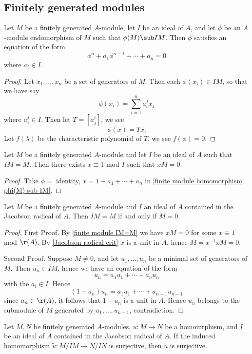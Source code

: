 \subsection{Finitely generated modules}
\begin{proposition}\label{finite module homomorphism phi(M) sub IM}
Let $M$ be a finitely generated $A$-module, let $I$ be an ideal of $A$, and let $\phi$ be an $A$-module endomorphism of $M$ such that $\phi(M)\sub IM$. Then $\phi$ satisfies an equation of the form
\[\phi^n+a_1\phi^{n-1}+\cdots+a_n=0\]
where $a_i\in I$.
\end{proposition}
\begin{proof}
Let $x_1,\dots,x_n$ be a set of generators of $M$. Then each $\phi(x_i)\in IM$, so that we have say
\[\phi(x_i)=\sum_{i=1}^na^j_ix_j\]
where $a^j_i\in I$. Then let $T=[a^i_j]$, we see
\[\phi (x)=Tx.\]
Let $f(\lambda)$ be the characteristic polynomial of $T$, we see $f(\phi)=0$.
\end{proof}
\begin{corollary}\label{finite module IM=M}
Let $M$ be a finitely generated $A$-module and let $I$ be an ideal of $A$ such that $IM=M$. Then there exists $x\equiv 1$ mod $I$ such that $xM=0$.
\end{corollary}
\begin{proof}
Take $\phi=$ identity, $x=1+a_1+\cdots+a_n$ in \cref{finite module homomorphism phi(M) sub IM}.
\end{proof}
\begin{proposition}\label{Nakayama lemma}
Let $M$ be a finitely generated $A$-module and $I$ an ideal of $A$ contained in the Jacobson radical of $A$. Then $IM=M$ if and only if $M=0$.
\end{proposition}
\begin{proof}
First Proof. By \cref{finite module IM=M} we have $xM=0$ for some $x\equiv 1$ mod $\r(A)$. By \cref{Jacobson radical crit} $x$ is a unit in $A$, hence $M=x^{-1}xM=0$.\par
Second Proof. Suppose $M\neq0$, and let $u_1,\dots,u_n$ be a minimal set of generators of $M$. Then $u_n\in IM$, hence we have an equation of the form 
\[u_n=a_1u_1+\cdots+a_nu_n\]
with the $a_i\in I$. Hence
\[(1-a_n)u_n=a_1u_1+\cdots+a_{n-1}u_{n-1}\]
since $a_n\in \r(A)$, it follows that $1-a_n$ is a unit in $A$. Hence $u_n$ belongs to the submodule of $M$ generated by $u_1,\dots,u_{n-1}$, contradiction.
\end{proof}
\begin{corollary}\label{finite module homomorphism surj iff tensor A/I}
Let $M,N$ be finitely generated $A$-modules, $u:M\to N$ be a homomrphism, and $I$ be an ideal of $A$ contained in the Jacobson radical of $A$. If the induced homomorphism $\tilde{u}:M/IM\to N/IN$ is surjective, then $u$ is surjective.
\end{corollary}
